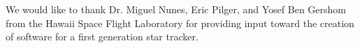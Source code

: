 \begin{acks}
	We would like to thank Dr. Miguel Nunes, Eric Pilger, and Yosef Ben Gershom from the Hawaii Space Flight Laboratory for providing input toward the creation of software for a first generation star tracker.
\end{acks}